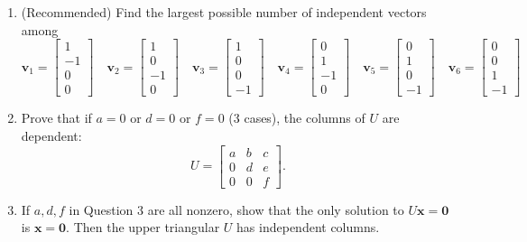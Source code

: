 \documentclass[14pt, a4paper]{article}
\begin{document}
\begin{enumerate}
    \item (Recommended) Find the largest possible number of independent vectors among
          \[
              \boldsymbol{v}_1 = \begin{bmatrix} 1 \\ -1 \\ 0 \\ 0 \end{bmatrix} \quad
              \boldsymbol{v}_2 = \begin{bmatrix} 1 \\ 0 \\ -1 \\ 0 \end{bmatrix} \quad
              \boldsymbol{v}_3 = \begin{bmatrix} 1 \\ 0 \\ 0 \\ -1 \end{bmatrix} \quad
              \boldsymbol{v}_4 = \begin{bmatrix} 0 \\ 1 \\ -1 \\ 0 \end{bmatrix} \quad
              \boldsymbol{v}_5 = \begin{bmatrix} 0 \\ 1 \\ 0 \\ -1 \end{bmatrix} \quad
              \boldsymbol{v}_6 = \begin{bmatrix} 0 \\ 0 \\ 1 \\ -1 \end{bmatrix}
          \]

    \item Prove that if $a = 0$ or $d = 0$ or $f = 0$ (3 cases), the columns of $U$ are dependent:
          \[
              U = \begin{bmatrix} a & b & c \\ 0 & d & e \\ 0 & 0 & f \end{bmatrix}.
          \]

    \item If $a, d, f$ in Question 3 are all nonzero, show that the only solution to $U\boldsymbol{x} = \boldsymbol{0}$ is $\boldsymbol{x} = \boldsymbol{0}$. Then the upper triangular $U$ has independent columns.


\end{enumerate}
\end{document}
